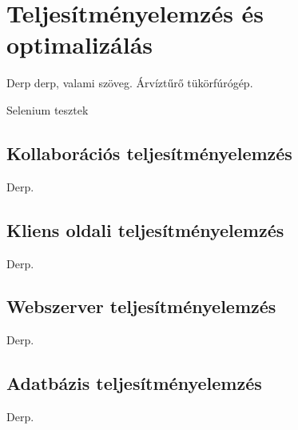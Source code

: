 \chapter{Teljesítményelemzés és optimalizálás}
Derp derp, valami szöveg. Árvíztűrő tükörfúrógép.

Selenium tesztek


\section{Kollaborációs teljesítményelemzés}
Derp.

\section{Kliens oldali teljesítményelemzés}
Derp.

\section{Webszerver teljesítményelemzés}
Derp.

\section{Adatbázis teljesítményelemzés}
Derp.





